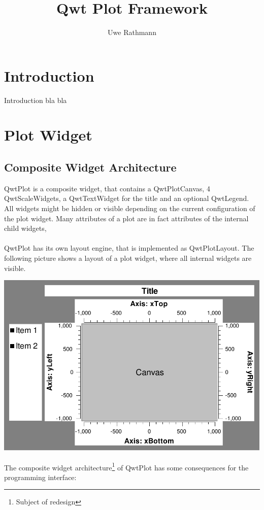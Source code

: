 \documentclass[12pt,a4paper]{book}
\author{Uwe Rathmann}
\title{Qwt Plot Framework}
\begin{document}
\maketitle
\pagestyle{headings}

\tableofcontents

\chapter{Introduction}

Introduction bla bla

\chapter{Plot Widget}

\section{Composite Widget Architecture}

QwtPlot is a composite widget, that contains a QwtPlotCanvas, 
4 QwtScaleWidgets, a QwtTextWidget for the title and an optional QwtLegend. 
All widgets might be hidden or visible depending on the current configuration 
of the plot widget. Many attributes of a plot are in fact 
attributes of the internal child widgets,
\\
\\
QwtPlot has its own layout engine, that is implemented as QwtPlotLayout. 
The following picture shows a layout of a plot widget, where all internal widgets are visible.

\bigskip
\includegraphics[scale=1.0]{plotlayout.pdf}
\bigskip

The composite widget architecture\footnote{Subject of redesign} 
of QwtPlot has some consequences for the programming interface:
\end{document}
